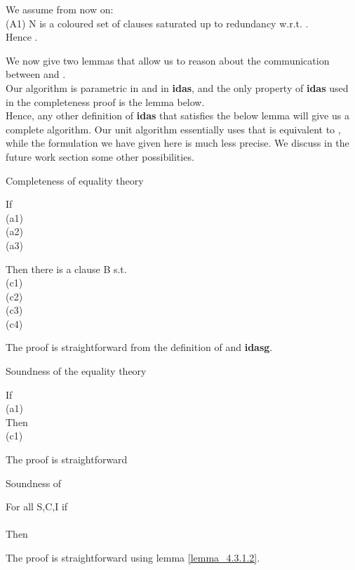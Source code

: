 \noindent
We assume from now on:\\
(A1) N is a coloured set of clauses saturated up to redundancy w.r.t. .\\
Hence .


\noindent
We now give two lemmas that allow us to reason about the communication between  and .\\
Our algorithm is parametric in \eqg and in \textbf{idas}, and the only property of \textbf{idas} used in the completeness proof is the lemma below.\\
Hence, any other definition of \textbf{idas} that satisfies the below lemma will give us a complete algorithm. Our unit algorithm essentially uses \eqg that is equivalent to , while the formulation we have given here is much less precise. We discuss in the future work section some other possibilities.

\noindent
\begin{lemma}{Completeness of equality theory}
\label{lemma_4.3.1.1}

\noindent
If \\
(a1) \\
(a2) \\
(a3) 

\noindent
Then there is a clause B s.t.\\
(c1) \\
(c2) \\
(c3) \\
(c4) 

\noindent
The proof is straightforward from the definition of \eqg and \textbf{idasg}.
\end{lemma}
\bigskip

\begin{lemma}{Soundness of the equality theory}
\label{lemma_4.3.1.2}

\noindent
If\\
(a1) \\
Then\\
(c1) 

\noindent
The proof is straightforward
\end{lemma}


\begin{theorem}{Soundness of }
\label{theorem_4.3.1.1}

\noindent
For all S,C,I if \\
\\
Then\\
 

\noindent
The proof is straightforward using lemma \ref{lemma_4.3.1.2}.
\end{theorem}


